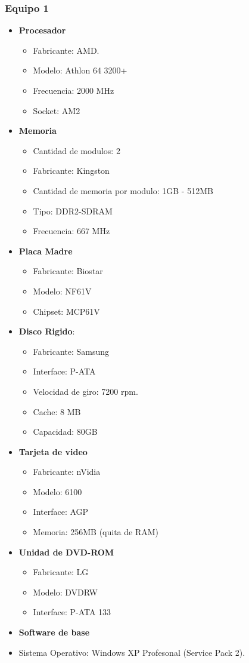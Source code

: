 \subsubsection{Equipo 1}
\begin{itemize}
\item \textbf{Procesador}
	\begin{itemize}
	\item Fabricante: AMD.	
	\item Modelo: Athlon 64 3200+
	\item Frecuencia: 2000 MHz
	\item Socket: AM2
	\end{itemize}
\item \textbf{Memoria}
	\begin{itemize}
	\item Cantidad de modulos: 2
	\item Fabricante: Kingston
	\item Cantidad de memoria por modulo: 1GB - 512MB
	\item Tipo: DDR2-SDRAM
	\item Frecuencia: 667 MHz
	\end{itemize}
\item \textbf{Placa Madre}
	\begin{itemize}
	\item Fabricante: Biostar 
	\item Modelo: NF61V
	\item Chipset: MCP61V
	\end{itemize}
\item \textbf{Disco Rigido}:
	\begin{itemize}
	\item Fabricante: Samsung
	\item Interface: P-ATA
	\item Velocidad de giro: 7200 rpm.
	\item Cache: 8 MB
	\item Capacidad: 80GB
	\end{itemize}
\item \textbf{Tarjeta de video}
	\begin{itemize}
	\item Fabricante: nVidia
	\item Modelo: 6100 
	\item Interface: AGP
	\item Memoria: 256MB (quita de RAM)
	\end{itemize}
\item \textbf{Unidad de DVD-ROM}
	\begin{itemize}
	\item Fabricante: LG
	\item Modelo: DVDRW
	\item Interface: P-ATA 133
	\end{itemize}
\item \textbf{Software de base}
	\item Sistema Operativo: Windows XP Profesonal (Service Pack 2).
\end{itemize} 
 
